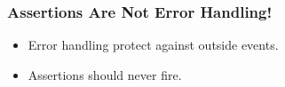 \begin{frame}[fragile] %
\frametitle{Assertions Are Not Error Handling!}

\begin{itemize}
\item Error handling protect against outside events.
\item Assertions \alert{should never} fire.
\end{itemize}
\end{frame}


